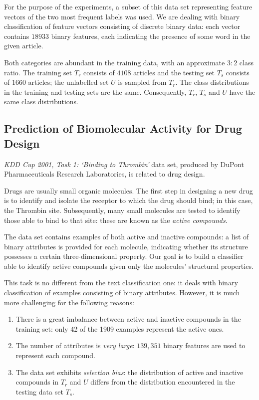 \documentclass[12pt,twoside,notitlepage,amsart]{report} %
\begin{document}
	For the purpose of the experiments, a subset of this data set representing feature vectors of the two most frequent labels was used. We are dealing with binary classification of feature vectors consisting of discrete binary data: each vector contains $18933$ binary features, each indicating the presence of some word in the given article. 
	
	Both categories are abundant in the training data, with an approximate $3:2$ class ratio. The training set $T_r$ consists of $4108$ articles and the testing set $T_s$ consists of $1660$ articles; the unlabelled set $U$ is sampled from $T_r$. The class distributions in the training and testing sets are the same. Consequently, $T_r$, $T_s$ and $U$ have the same class distributions. 
	
	\subsection{Prediction of Biomolecular Activity for Drug Design}
	
	\emph{KDD Cup 2001, Task 1: `Binding to Thrombin'} data set, produced by DuPont Pharmaceuticals Research Laboratories, is related to drug design.
	
	Drugs are usually small organic molecules. The first step in designing a new drug is to identify and isolate the receptor to which the drug should bind; in this case, the Thrombin site. Subsequently, many small molecules are tested to identify those able to bind to that site: these are known as the \emph{active compounds}.
	
	The data set contains examples of both active and inactive compounds: a list of binary attributes is provided for each molecule, indicating whether its structure possesses a certain three-dimensional property. Our goal is to build a classifier able to identify active compounds given only the molecules' structural properties. 
	
	This task is no different from the text classification one: it deals with binary classification of examples consisting of binary attributes. However, it is much more challenging for the following reasons: %
	
	\begin{enumerate}
	
	\item There is a great imbalance between active and inactive compounds in the training set: only 42 of the 1909 examples represent the active ones. 
	
	\item The number of attributes is \emph{very large}: {$139,351$ binary features} are used to represent each compound. 
	
	\item The data set exhibits \emph{selection bias}: the distribution of active and inactive compounds in $T_r$ and $U$ differs from the distribution encountered in the testing data set $T_s$. 
	\end{enumerate}
	
\end{document}
